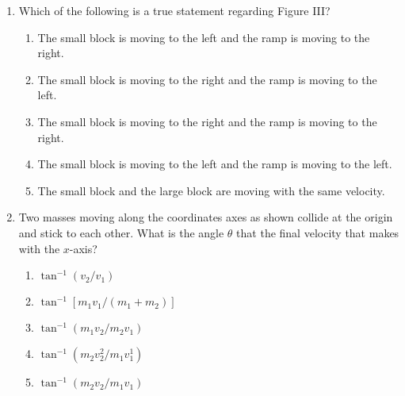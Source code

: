 \documentclass{../../../oss-apphys}
\begin{document}
\begin{multicols}{2}
\begin{enumerate}[resume,leftmargin=18pt]
  \item Which of the following is a true statement regarding Figure III?
    \label{ramps2}
    \begin{enumerate}[nosep,leftmargin=18pt,label=(\Alph*)]
    \item The small block is moving to the left and the ramp is moving to the
      right.
    \item The small block is moving to the right and the ramp is moving to the
      left.
    \item The small block is moving to the right and the ramp is moving to the
      right.
    \item The small block is moving to the left and the ramp is moving to the
      left.
    \item The small block and the large block are moving with the same velocity.
    \end{enumerate}
    
    \columnbreak
    
  \item Two masses moving along the coordinates axes as shown collide at the
    origin and stick to each other. What is the angle $\theta$ that the final
    velocity that makes with the $x$-axis?
    \begin{center}
    \end{center}
    \begin{enumerate}[nosep,leftmargin=18pt,label=(\Alph*)]
    \item $\tan^{-1}(v_2/v_1)$
    \item $\tan^{-1}[m_1v_1/(m_1+m_2)]$
    \item $\tan^{-1}(m_1v_2/m_2v_1)$
    \item $\tan^{-1}(m_2v_2^2/m_1v_1^1)$
    \item $\tan^{-1}(m_2v_2/m_1v_1)$
    \end{enumerate}
    \columnbreak
    

\end{enumerate}
\end{multicols}
\end{document}
